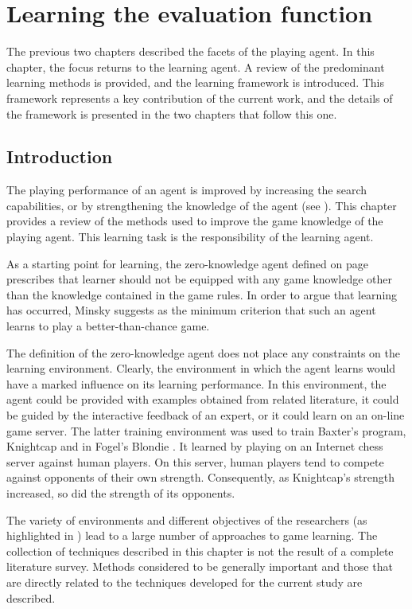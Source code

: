 \chapter*{Learning the evaluation function}
\label{chap:learning}
{\chapterintro
The previous two chapters described the facets of the playing agent.  In this chapter, the focus returns to the learning agent.  A review of the predominant learning methods is provided, and the learning framework is introduced.  This framework represents a key contribution of the current work, and the details of the framework is presented in the two chapters that follow this one.
}
\section{Introduction}
The playing performance of an agent is improved by increasing the search capabilities, or by strengthening the knowledge of the agent (see ).  This chapter provides a review of the methods used to improve the game knowledge of the playing agent.  This learning task is the responsibility of the learning agent.    

As a starting point for learning, the zero-knowledge agent defined on page \pageref{def:zero} prescribes that learner should not be equipped with any game knowledge other than the knowledge contained in the game rules.  In order to argue that learning has occurred, Minsky \cite{minsky:steps} suggests as the minimum criterion that such an agent learns to play a better-than-chance game. 

The definition of the zero-knowledge agent does not place any constraints on the learning environment. Clearly, the environment in which the agent learns would have a marked influence on its learning performance.  In this environment, the agent could be provided with examples obtained from related literature, it could be guided by the interactive feedback of an expert, or it could learn on an on-line game server.  The latter training environment was used to train Baxter's  program, Knightcap \cite{baxter:chess} and in Fogel's Blondie \cite{fogel:edge}. It learned by playing on an Internet chess server against human players. On this server, human players tend to compete against opponents of their own strength.  Consequently, as Knightcap's strength increased, so did the strength of its opponents.  

The variety of environments and different objectives of the researchers (as highlighted in ) lead to a large number of approaches to game learning.  The collection of techniques described in this chapter is not the result of a complete literature survey.  Methods considered to be  generally important and those that are directly related to the techniques developed for the current study are described.

